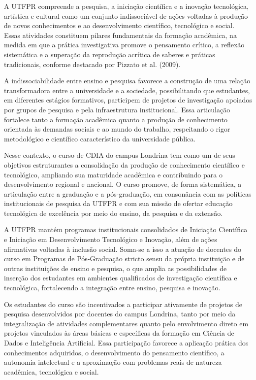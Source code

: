 A UTFPR compreende a pesquisa, a iniciação científica e a inovação tecnológica, artística e cultural como um conjunto indissociável de ações voltadas à produção de novos conhecimentos e ao desenvolvimento científico, tecnológico e social. Essas atividades constituem pilares fundamentais da formação acadêmica, na medida em que a prática investigativa promove o pensamento crítico, a reflexão sistemática e a superação da reprodução acrítica de saberes e práticas tradicionais, conforme destacado por Pizzato et al. (2009).

A indissociabilidade entre ensino e pesquisa favorece a construção de uma relação transformadora entre a universidade e a sociedade, possibilitando que estudantes, em diferentes estágios formativos, participem de projetos de investigação apoiados por grupos de pesquisa e pela infraestrutura institucional. Essa articulação fortalece tanto a formação acadêmica quanto a produção de conhecimento orientada às demandas sociais e ao mundo do trabalho, respeitando o rigor metodológico e científico característico da universidade pública.

Nesse contexto, o curso de CDIA do campus Londrina tem como um de seus objetivos estruturantes a consolidação da produção de conhecimento científico e tecnológico, ampliando sua maturidade acadêmica e contribuindo para o desenvolvimento regional e nacional. O curso promove, de forma sistemática, a articulação entre a graduação e a pós-graduação, em consonância com as políticas institucionais de pesquisa da UTFPR e com sua missão de ofertar educação tecnológica de excelência por meio do ensino, da pesquisa e da extensão.

A UTFPR mantém programas institucionais consolidados de Iniciação Científica e Iniciação em Desenvolvimento Tecnológico e Inovação, além de ações afirmativas voltadas à inclusão social. Soma-se a isso a atuação de docentes do curso em Programas de Pós-Graduação stricto sensu da própria instituição e de outras instituições de ensino e pesquisa, o que amplia as possibilidades de inserção dos estudantes em ambientes qualificados de investigação científica e tecnológica, fortalecendo a integração entre ensino, pesquisa e inovação.

Os estudantes do curso são incentivados a participar ativamente de projetos de pesquisa desenvolvidos por docentes do campus Londrina, tanto por meio da integralização de atividades complementares quanto pelo envolvimento direto em projetos vinculados às áreas básicas e específicas da formação em Ciência de Dados e Inteligência Artificial. Essa participação favorece a aplicação prática dos conhecimentos adquiridos, o desenvolvimento do pensamento científico, a autonomia intelectual e a aproximação com problemas reais de natureza acadêmica, tecnológica e social.

